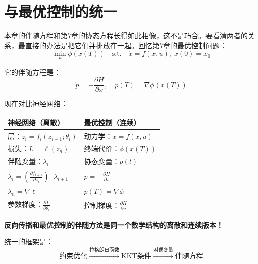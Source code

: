 \section{与最优控制的统一}


本章的伴随方程和第7章的协态方程长得如此相像，这不是巧合。要看清两者的关系，最直接的办法是把它们并排放在一起。回忆第7章的最优控制问题：
\begin{equation}
\min_u \phi(x(T)) \quad \text{s.t.} \quad \dot{x} = f(x, u), \; x(0) = x_0
\end{equation}

它的伴随方程是：
\begin{equation}
\dot{p} = -\frac{\partial H}{\partial x}, \quad p(T) = \nabla \phi(x(T))
\end{equation}

现在对比神经网络：

\begin{center}
\begin{tabular}{ll}
\toprule
\textbf{神经网络（离散）} & \textbf{最优控制（连续）} \\
\midrule
层：$z_i = f_i(z_{i-1}; \theta_i)$ & 动力学：$\dot{x} = f(x, u)$ \\
损失：$L = \ell(z_n)$ & 终端代价：$\phi(x(T))$ \\
伴随变量：$\lambda_i$ & 协态变量：$p(t)$ \\
$\lambda_i = \left(\frac{\partial f_{i+1}}{\partial z_i}\right)^\top \lambda_{i+1}$ & $\dot{p} = -\frac{\partial H}{\partial x}$ \\
$\lambda_n = \nabla \ell$ & $p(T) = \nabla \phi$ \\
参数梯度：$\frac{\partial L}{\partial \theta_i}$ & 控制梯度：$\frac{\partial H}{\partial u}$ \\
\bottomrule
\end{tabular}
\end{center}

\begin{unification}[title=统一视角]
\textbf{反向传播和最优控制的伴随方法是同一个数学结构的离散和连续版本！}




统一的框架是：
\begin{equation}
\text{约束优化} \xrightarrow{\text{拉格朗日函数}} \text{KKT条件} \xrightarrow{\text{对偶变量}} \text{伴随方程}
\end{equation}
\end{unification}

